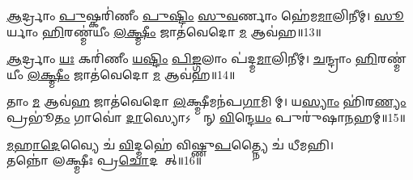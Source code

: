 \ul{𑌆}𑌰𑍍𑌦𑍍𑌰𑌾𑌂 \ul{𑌪𑍁}𑌷𑍍𑌕𑌰𑌿॑𑌣𑍀𑌂 \ul{𑌪𑍁}\ul{𑌷𑍍𑌟𑌿𑌂} \ul{𑌸𑍁}\ul{𑌵}𑌰𑍍𑌣𑌾𑌂 𑌹𑍇॑𑌮\ul{𑌮𑌾}𑌲𑌿𑌨𑍀𑌮𑍍।
\ul{𑌸𑍂}𑌰𑍍𑌯𑌾𑌂 \ul{𑌹𑌿}𑌰𑌣𑍍𑌮॑𑌯𑍀𑌂 \ul{𑌲}\ul{𑌕𑍍𑌷𑍍𑌮𑍀𑌂} 𑌜𑌾𑌤॑𑌵𑍇𑌦𑍋 \ul{𑌮} 𑌆𑌵॑𑌹॥13॥

\ul{𑌆}𑌰𑍍𑌦𑍍𑌰𑌾𑌂 \ul{𑌯𑌃} 𑌕𑌰𑌿॑𑌣𑍀𑌂 \ul{𑌯}\ul{𑌷𑍍𑌟𑌿𑌂} \ul{𑌪𑌿}\ul{𑌙𑍍𑌗}𑌲𑌾𑌂 𑌪॑𑌦𑍍𑌮\ul{𑌮𑌾}𑌲𑌿𑌨𑍀𑌮𑍍।
\ul{𑌚}𑌨𑍍𑌦𑍍𑌰𑌾𑌂 \ul{𑌹𑌿}𑌰𑌣𑍍𑌮॑𑌯𑍀𑌂 \ul{𑌲}\ul{𑌕𑍍𑌷𑍍𑌮𑍀𑌂} 𑌜𑌾𑌤॑𑌵𑍇𑌦𑍋 \ul{𑌮} 𑌆𑌵॑𑌹॥14॥

𑌤𑌾𑌂 \ul{𑌮} 𑌆𑌵॑\ul{𑌹} 𑌜𑌾𑌤॑𑌵𑍇𑌦𑍋 \ul{𑌲}𑌕𑍍𑌷𑍍𑌮𑍀𑌮𑌨॑𑌪\ul{𑌗𑌾}𑌮𑌿𑌨𑍀᳚𑌮𑍍।
𑌯\ul{𑌸𑍍𑌯𑌾𑌂} 𑌹𑌿॑𑌰\ul{𑌣𑍍𑌯𑌂} 𑌪𑍍𑌰𑌭𑍂॑\ul{𑌤𑌂} 𑌗𑌾𑌵𑍋॑ \ul{𑌦𑌾}𑌸𑍍𑌯𑍋𑌽𑌶𑍍𑌵𑌾᳚𑌨𑍍 \ul{𑌵𑌿}𑌨𑍍𑌦𑍇\ul{𑌯𑌂} 𑌪𑍁𑌰𑍁॑𑌷𑌾\ul{𑌨}𑌹𑌮𑍍॥15॥

\begin{center}
{\ul{𑌮}\ul{𑌹𑌾}\ul{𑌦𑍇}𑌵𑍍𑌯𑍈 𑌚॑ \ul{𑌵𑌿}𑌦𑍍𑌮𑌹𑍇॑ 𑌵𑌿𑌷𑍍𑌣𑍁\ul{𑌪}𑌤𑍍𑌨𑍍𑌯𑍈 𑌚॑ 𑌧𑍀𑌮𑌹𑌿।\\
𑌤𑌨𑍍𑌨𑍋॑ 𑌲𑌕𑍍𑌷𑍍𑌮𑍀𑌃 𑌪𑍍𑌰\ul{𑌚𑍋}𑌦𑌯𑌾᳚𑌤𑍍॥16॥}
\end{center}
